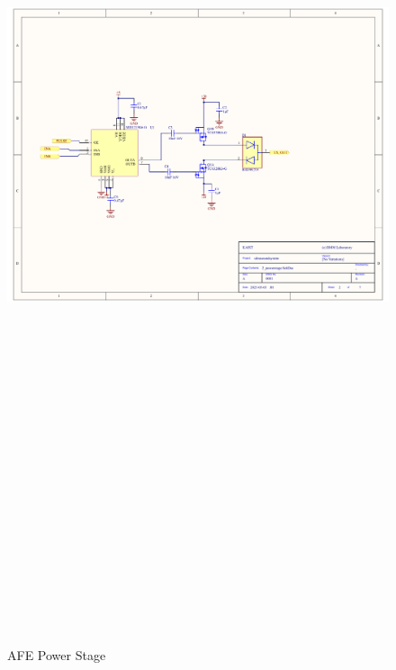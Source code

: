 \begin{landscape}
	\begin{figure}[htbp]
		\centering
		\includegraphics[width=20cm,height=28.7cm,keepaspectratio]{Figures/appendix/afe_altium/2_powerstage.pdf}
		\caption{AFE Power Stage}
		\label{fig:appendix_2_powerstage}
	\end{figure}
\end{landscape}
